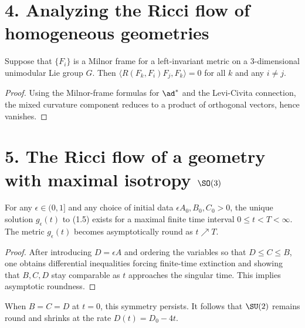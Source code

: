 \section*{4. Analyzing the Ricci flow of homogeneous geometries}

\begin{lemma}
\label{ch01-lem-curvature-offdiagonal}

Suppose that $\{F_i\}$ is a Milnor frame for a left-invariant metric on a $3$-dimensional unimodular Lie group $G$. Then $\langle R(F_k,F_i)F_j,F_k\rangle = 0$ for all $k$ and any $i\neq j$.
\end{lemma}

\begin{proof}
\sketch Using the Milnor-frame formulas for $\ad^*$ and the Levi-Civita connection, the mixed curvature component reduces to a product of orthogonal vectors, hence vanishes.
\end{proof}

\section*{5. The Ricci flow of a geometry with maximal isotropy $\SO(3)$}

\begin{proposition}
\label{ch01-prop-su2-collapse}

For any $\epsilon \in (0,1]$ and any choice of initial data $\epsilon A_0, B_0, C_0 > 0$, the unique solution $g_\epsilon(t)$ to (1.5) exists for a maximal finite time interval $0 \leq t < T < \infty$. The metric $g_\epsilon(t)$ becomes asymptotically round as $t \nearrow T$.
\end{proposition}

\begin{proof}
\sketch After introducing $D=\epsilon A$ and ordering the variables so that $D\le C \le B$, one obtains differential inequalities forcing finite-time extinction and showing that $B,C,D$ stay comparable as $t$ approaches the singular time. This implies asymptotic roundness.
\end{proof}

\begin{remark}
\label{ch01-rem-round-sphere}

When $B=C=D$ at $t=0$, this symmetry persists. It follows that $\SU(2)$ remains round and shrinks at the rate $D(t)=D_0-4t$.
\end{remark}

